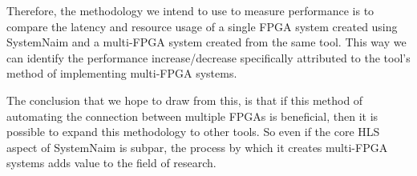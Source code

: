 Therefore, the methodology we intend to use to measure performance is to compare the latency and resource usage of a single FPGA system created using SystemNaim and a multi-FPGA system created from the same tool. This way we can identify the performance increase/decrease specifically attributed to the tool's method of implementing multi-FPGA systems. 

The conclusion that we hope to draw from this, is that if this method of automating the connection between multiple FPGAs is beneficial, then it is possible to expand this methodology to other tools. So even if the core HLS aspect of SystemNaim is subpar, the process by which it creates multi-FPGA systems adds value to the field of research.



